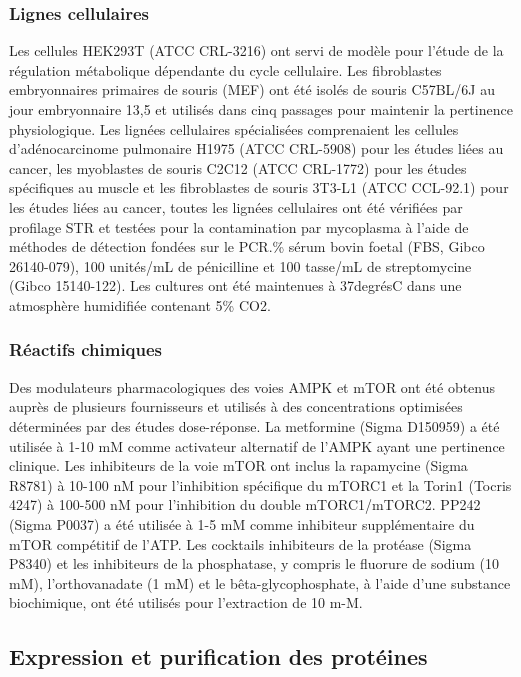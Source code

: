 \documentclass[11pt,a4paper]{article}
\begin{document}
\subsubsection{Lignes cellulaires}

Les cellules HEK293T (ATCC CRL-3216) ont servi de modèle pour l'étude de la régulation métabolique dépendante du cycle cellulaire. Les fibroblastes embryonnaires primaires de souris (MEF) ont été isolés de souris C57BL/6J au jour embryonnaire 13,5 et utilisés dans cinq passages pour maintenir la pertinence physiologique. Les lignées cellulaires spécialisées comprenaient les cellules d'adénocarcinome pulmonaire H1975 (ATCC CRL-5908) pour les études liées au cancer, les myoblastes de souris C2C12 (ATCC CRL-1772) pour les études spécifiques au muscle et les fibroblastes de souris 3T3-L1 (ATCC CCL-92.1) pour les études liées au cancer, toutes les lignées cellulaires ont été vérifiées par profilage STR et testées pour la contamination par mycoplasma à l'aide de méthodes de détection fondées sur le PCR.\% sérum bovin foetal (FBS, Gibco 26140-079), 100 unités/mL de pénicilline et 100 tasse/mL de streptomycine (Gibco 15140-122). Les cultures ont été maintenues à 37degrésC dans une atmosphère humidifiée contenant 5\% CO2.

\subsubsection{Réactifs chimiques}

Des modulateurs pharmacologiques des voies AMPK et mTOR ont été obtenus auprès de plusieurs fournisseurs et utilisés à des concentrations optimisées déterminées par des études dose-réponse. La metformine (Sigma D150959) a été utilisée à 1-10 mM comme activateur alternatif de l'AMPK ayant une pertinence clinique. Les inhibiteurs de la voie mTOR ont inclus la rapamycine (Sigma R8781) à 10-100 nM pour l'inhibition spécifique du mTORC1 et la Torin1 (Tocris 4247) à 100-500 nM pour l'inhibition du double mTORC1/mTORC2. PP242 (Sigma P0037) a été utilisée à 1-5 mM comme inhibiteur supplémentaire du mTOR compétitif de l'ATP. Les cocktails inhibiteurs de la protéase (Sigma P8340) et les inhibiteurs de la phosphatase, y compris le fluorure de sodium (10 mM), l'orthovanadate (1 mM) et le bêta-glycophosphate, à l'aide d'une substance biochimique, ont été utilisés pour l'extraction de 10 m-M.

\subsection{Expression et purification des protéines}
\end{document}
